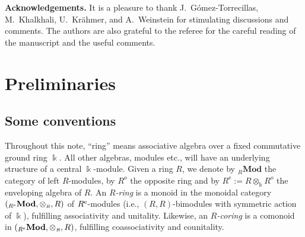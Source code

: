 \documentclass[reqno, a4paper, 10pt]{amsart}
\numberwithin{equation}{section}
\theoremstyle{plain}
\theoremstyle{definition}
\theoremstyle{remark}
\begin{document}
\smallskip

\textbf{Acknowledgements.}  
It is a pleasure to thank J.~G\'omez-Torrecillas, M.~Khalkhali, U.~Kr\"ahmer, and A.~Weinstein for stimulating discussions and comments.  The authors are also grateful to the referee for the careful reading of the manuscript and the useful comments.

\section{Preliminaries}
\subsection{Some conventions}
Throughout this note, ``ring'' means associative algebra over a fixed commutative ground ring $\Bbbk$. 
All other algebras, modules etc., will have an underlying structure of a central 
$\Bbbk$-module. 
Given a ring $R$, we denote by ${}_R{\mathbf{Mod}}$ the category of 
left $R$-modules, 
by $R^{o}$ the 
opposite ring and by
$R^\mathrm{e} := R \otimes_{\Bbbk} R^{o}$ 
the enveloping algebra 
of $R$. 
An {\em $R$-ring} is a monoid
in the monoidal
category $({}_{{R^{\rm e}}}{\mathbf{Mod}}, \otimes_{{\scriptscriptstyle{R}}}, R)$ of ${{R^{\rm e}}}$-modules (i.e., $(R,R)$-bimodules
with symmetric action of $\Bbbk$), fulfilling
associativity and unitality. Likewise,  
an {\em $R$-coring} is a comonoid in
$({}_{{R^{\rm e}}}{\mathbf{Mod}}, \otimes_{{\scriptscriptstyle{R}}}, R)$,  
fulfilling coassociativity and
counitality. 
\end{document}
